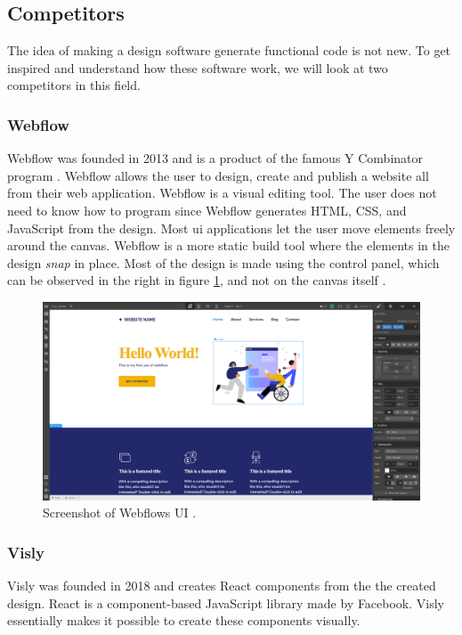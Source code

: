 \subsection{Competitors}%
\label{sub:Competitors}
The idea of making a design software generate functional code is not new. To get inspired and understand how these software work, we will look at two competitors in this field. 

\subsubsection{Webflow}
Webflow was founded in 2013 and is a product of the famous Y Combinator program \cite{Combinator}. Webflow allows the user to design, create and publish a website all from their web application. Webflow is a visual editing tool. The user does not need to know how to program since Webflow generates HTML, CSS, and JavaScript from the design. Most \acrshort{ui} applications let the user move elements freely around the canvas. Webflow is a more static build tool where the elements in the design \textit{snap} in place. Most of the design is made using the control panel, which can be observed in the right in figure \ref{fig:webflow}, and not on the canvas itself \cite{ResponsiveWebDesign}. 

\begin{figure}[H]
  \centering
  \includegraphics[width=0.8\linewidth]{images/webflow.png}
  \caption{Screenshot of Webflows UI \cite{ResponsiveWebDesigna}.}%
  \label{fig:webflow}
\end{figure}

\subsubsection{Visly}%
\label{ssub:Visly}
Visly was founded in 2018 and creates React \glspl{component} \cite{facebookincReactJavaScriptLibrary} from the the created design. React is a component-based JavaScript library made by Facebook. Visly essentially makes it possible to create these \glspl{component} visually. 

